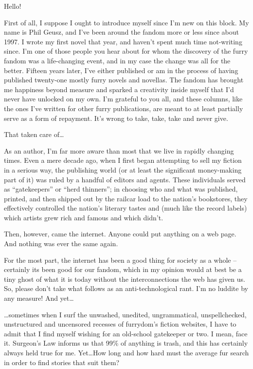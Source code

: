 
Hello!

First of all, I suppose I ought to introduce myself since I'm new on this block. My name is Phil Geusz, and I've been around the fandom more or less since about 1997. I wrote my first novel that year, and haven't spent much time not-writing since. I'm one of those people you hear about for whom the discovery of the furry fandom was a life-changing event, and in my case the change was all for the better. Fifteen years later, I've either published or am in the process of having published twenty-one mostly furry novels and novellas. The fandom has brought me happiness beyond measure and sparked a creativity inside myself that I'd never have unlocked on my own. I'm grateful to you all, and these columns, like the ones I've written for other furry publications, are meant to at least partially serve as a form of repayment. It's wrong to take, take, take and never give.

That taken care of\ldots

As an author, I'm far more aware than most that we live in rapidly changing times. Even a mere decade ago, when I first began attempting to sell my fiction in a serious way, the publishing world (or at least the significant money-making part of it) was ruled by a handful of editors and agents. These individuals served as ``gatekeepers'' or ``herd thinners''; in choosing who and what was published, printed, and then shipped out by the railcar load to the nation's bookstores, they effectively controlled the nation's literary tastes and (much like the record labels) which artists grew rich and famous and which didn't.

Then, however, came the internet. Anyone could put anything on a web page. And nothing was ever the same again.

For the most part, the internet has been a good thing for society as a whole -- certainly its been good for our fandom, which in my opinion would at best be a tiny ghost of what it is today without the interconnections the web has given us. So, please don't take what follows as an anti-technological rant. I'm no luddite by any measure! And yet\ldots

\ldots sometimes when I surf the unwashed, unedited, ungrammatical, unspellchecked, unstructured and uncensored recesses of furrydom's fiction websites, I have to admit that I find myself wishing for an old-school gatekeeper or two. I mean, face it. Surgeon's Law informs us that 99\% of anything is trash, and this has certainly always held true for me. Yet\ldots  How long and how hard must the average fur search in order to find stories that suit them?

